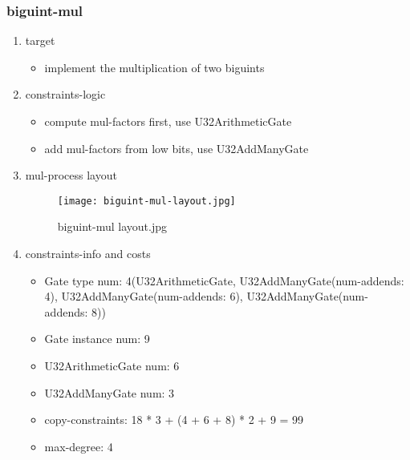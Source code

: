 \subsubsection{biguint-mul}
\label{biguint-mul}

\begin{enumerate}
    \item target
        \begin{itemize}
            \item implement the multiplication of two biguints
        \end{itemize}
    \item constraints-logic
        \begin{itemize}
            \item compute mul-factors first, use U32ArithmeticGate
            \item add mul-factors from low bits, use U32AddManyGate
        \end{itemize}
    \item mul-process layout
        \begin{figure}[!ht]
            \centering
            \texttt{[image: biguint-mul-layout.jpg]}
            \caption{biguint-mul layout.jpg}
            \label{fig:biguint-mul-layout.jpg}
        \end{figure}
    
    \item constraints-info and costs
        \begin{itemize}
            \item Gate type num: 4(U32ArithmeticGate, U32AddManyGate(num-addends: 4), U32AddManyGate(num-addends: 6), U32AddManyGate(num-addends: 8))
            \item Gate instance num: 9
            \item U32ArithmeticGate num: 6
            \item U32AddManyGate num: 3
            \item copy-constraints: 18 * 3 + (4 + 6 + 8) * 2 + 9 = 99
            \item max-degree: 4
        \end{itemize}

\end{enumerate}